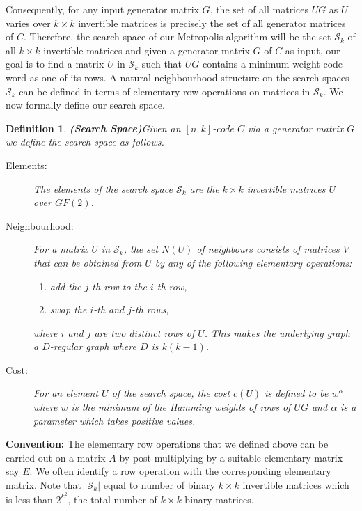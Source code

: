 \documentclass{sig-alternate-2013}
\newtheorem{definition}[theorem]{Definition}
\begin{document}
Consequently, for any input generator matrix $G$, the set of all
matrices $UG$ as $U$ varies over $k \times k$ invertible matrices is
precisely the set of all generator matrices of $C$.  Therefore, the
search space of our Metropolis algorithm will be the set
$\mathcal{S}_k$ of all $k \times k$ invertible matrices and given a
generator matrix $G$ of $C$ as input, our goal is to find a matrix $U$
in $\mathcal{S}_k$ such that $UG$ contains a minimum weight code word
as one of its rows. A natural neighbourhood structure on the search
spaces $\mathcal{S}_k$ can be defined in terms of elementary row
operations on matrices in $\mathcal{S}_k$. We now formally define our
search space.

\begin{definition}{\bf(Search Space)}\label{sp-defn}
  Given an $[n,k]$-code $C$ via a generator matrix $G$ we define the
  search space as follows.
  \begin{description}
  \item [Elements:] The elements of the search space $\mathcal{S}_k$
    are the $k \times k$ invertible matrices $U$ over $GF(2)$.
  \item[Neighbourhood:] For a matrix $U$ in $\mathcal{S}_k$, the set
    $N(U)$ of neighbours consists of matrices $V$ that can be obtained
    from $U$ by any of the following elementary operations:
    \begin{enumerate}
    \item add the $j$-th row to the $i$-th row,
    \item swap the $i$-th and $j$-th rows,
    \end{enumerate}
    where $i$ and $j$ are two distinct rows of $U$.  This makes the
    underlying graph a $D$-regular graph where $D$ is $k(k-1)$.
  \item[Cost:] For an element $U$ of the search space, the cost
    $c(U)$ is defined to be $w^\alpha$ where $w$ is the minimum of
    the Hamming weights of rows of $UG$ and $\alpha$ is a parameter
    which takes positive values.
  \end{description}
\end{definition}

{\bf Convention:} The elementary row operations that we defined above
can be carried out on a matrix $A$ by post multiplying by a suitable
elementary matrix say $E$. We often identify a row operation with the
corresponding elementary matrix.  Note that $|\mathcal{S}_k|$ equal to
number of binary $ k \times k$ invertible matrices which is less than
$2^{k^2}$, the total number of $k \times k$ binary matrices.
\end{document}
